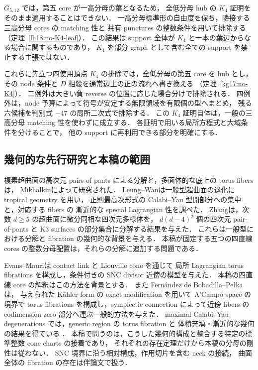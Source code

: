 $G_{5,12}$ では，第五 core が一高分母の葉となるため，
全低分母 hub の $K_4$ 証明をそのまま適用することはできない．
一高分母標準形の自由度を保ち，隣接する三高分母 cores の matching 性と
共有 punctures の整数条件を用いて排除する
（定理~\ref{lh18:no-K4-leaf}）．
この結果は support 全体が $K_4$ と一本の葉辺からなる場合に関するものであり，
$K_4$ を部分 graph として含む全ての support を禁止する主張ではない．

これらに先立つ四使用頂点 $K_4$ の排除では，全低分母の第五 core を hub とし，
その node 条件と $D$ 相殺を通常辺上の正の流れへ書き換える
（定理~\ref{kg17:no-K4}）．
二例外は大きい負 reverse の位置に応じた場合分けで排除される．
四例外は，node 予算によって符号が安定する無限領域を有限個の型へまとめ，
残る六候補を判別式 $-47$ の局所二次式で排除する．
この $K_4$ 証明自体は，一般の三高分母 matching 性を使わずに成立する．
各証明で用いる局所方程式と大域条件を分けることで，
他の support に再利用できる部分を明確にする．

\subsection{幾何的な先行研究と本稿の範囲}

複素超曲面の高次元 pairs-of-pants による分解と，多面体的な底上の torus fibers は，
Mikhalkin\cite[Theorems~1 and~1$'$]{Mikhalkin}によって研究された．
Leung--Wan\cite{LeungWan}は一般型超曲面の退化に tropical geometry を用い，
正則最高次形式の Calabi--Yau 型開部分への集中と，対応する fibers の
漸近的な special Lagrangian 性を調べた．
Zhang\cite[Theorem~1.1]{Zhang}は，次数 $d\ge5$ の超曲面に微分同相な四次元多様体を，
$d(d-4)^2$ 個の四次元 pair-of-pants と K3 surfaces の部分集合に分解する結果を与えた．
これらは一般型における分解と fibration の幾何的な背景を与える．
本稿が固定する五つの四直線 cores の整数分母配置は，それらの分解に追加する問題である．

Evans--Mauri\cite{EM}は contact link と Liouville cone を通じて
局所 Lagrangian torus fibrations を構成し，条件付きの SNC divisor 近傍の模型を与えた．
本稿の四直線 core の解釈はこの方法を背景とする．
また Fernández de Bobadilla--Pełka\cite[Theorem~6.14]{FernandezBobadillaPelka}は，
与えられた Kähler form の exact modification を用いて A'Campo space の境界で
torus fibrations を構成し，symplectic connection によって近傍 fibers の
codimension-zero 部分へ運ぶ一般的方法を与えた．
maximal Calabi--Yau degenerations では，generic region の torus fibration と
体積充填・漸近的な幾何の結果を得ている
\cite[Theorems~1.1--1.2]{FernandezBobadillaPelka}．
本稿で問うのは，こうした幾何的構成と整合する特定の標準整数 cone charts の接着であり，
それぞれの存在定理だけから本稿の分母の剛性は従わない．
SNC 境界に沿う相対構成，作用切片を含む neck の接続，
曲面全体の fibration の存在は伴論文\cite{SurfaceGeometry}で扱う．

